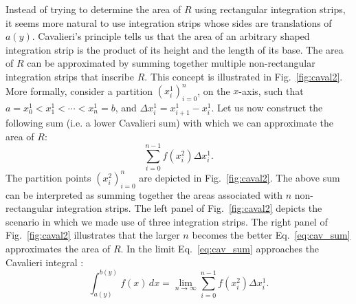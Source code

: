 \documentclass{article}
\theoremstyle{theorem}
\theoremstyle{definition}
\begin{document}
\noindent
Instead of trying to determine the area of $R$ using rectangular integration strips, it seems more natural 
to use integration strips whose sides are translations of $a(y)$. Cavalieri's principle tells us that the area of an 
arbitrary shaped integration strip is the product of its height and the length of its base. The area of $R$ 
can be approximated by summing together multiple non-rectangular integration strips that inscribe $R$. This concept is illustrated in Fig.~\eqref{fig:caval2}. 
More formally, consider a partition $(x_i^1)_{i=0}^{n}$, on the $x$-axis, such that $a = x_0^1 < x_1^1 < \cdots < x_n^1 = b$, and $\Delta x_i^1 = x_{i+1}^1 - x_i^1$.
Let us now construct the following sum (i.e. a lower Cavalieri sum) with which we can approximate the area 
of $R$:
\begin{equation}
\label{eq:cav_sum}
\sum_{i=0}^{n-1} f(x_i^2)\Delta x_i^1.
\end{equation}
The partition points $(x_i^2)_{i=0}^{n}$ are depicted in Fig.~\ref{fig:caval2}.
The above sum can be interpreted as summing together the areas associated with $n$ non-rectangular integration strips.
The left panel of Fig.~\ref{fig:caval2} depicts the scenario in which we made use of three integration strips.  
The right panel of Fig.~\ref{fig:caval2} illustrates that the larger $n$ becomes the better Eq.~\eqref{eq:cav_sum} approximates the area of $R$. In the limit Eq.~\eqref{eq:cav_sum} approaches the Cavalieri integral \cite{ackermann2012}:
\begin{equation}
\label{eq:caval1}
\int_{a(y)}^{b(y)}f(x)\, dx = \lim_{n\to \infty}\sum_{i=0}^{n-1} f(x_i^2)\Delta x_i^1.
\end{equation}
\end{document}
